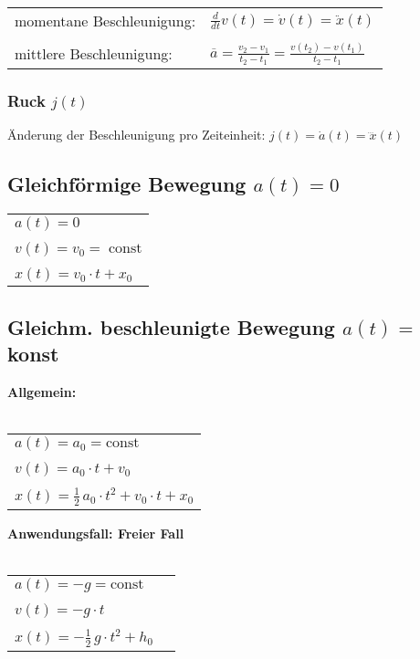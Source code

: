 	\begin{tabular}{ll}
	momentane Beschleunigung: & $\frac{d}{dt} v(t) = \dot{v}(t) = \ddot{x}(t)$ \\	
	\\
	mittlere Beschleunigung: & $\overline{a} = \frac{v_2 -v_1}{t_2 - t_1} =  \frac{v(t_2) - v(t_1)}{t_2 - t_1} $ \\
	\end{tabular}
	
		
		
		
	\subsubsection{Ruck $j(t)$}
	Änderung der Beschleunigung pro Zeiteinheit: $j(t) = \dot{a}(t) = \dddot{x}(t)$
	
		
		
	\subsection{Gleichförmige Bewegung $a(t) = 0$}
	\begin{tabular}{l}
	$a(t) = 0$ \\
	\\
	$v(t) = v_0 = \; \text{const}$ \\
	\\
	$x(t) = v_0 \cdot t + x_0 $ \\
	\end{tabular}
		

		
		
		
		
		
		
	\subsection{Gleichm. beschleunigte Bewegung $a(t) = $ konst}
	\begin{minipage}{0.48\linewidth}
	\textbf{Allgemein:} \\
	\\
	\begin{tabular}{l}
	$a(t) = a_0 = \text{const}$ \\
	\\
	$v(t) = a_0 \cdot t + v_0$ \\
	\\
	$x(t) = \frac{1}{2} \, a_0 \cdot t^2 + v_0 \cdot t + x_0$
	\end{tabular}
	\end{minipage}
	\hfill
	\begin{minipage}{0.48\linewidth}
	\textbf{Anwendungsfall: Freier Fall} \\
	\\
	\begin{tabular}{ll}
	$a(t) = -g = \text{const}$ \\
	\\
	$v(t) = -g \cdot t $ \\
	\\
	$x(t) = - \frac{1}{2} \, g \cdot t^2 + h_0$
	\end{tabular}
	\end{minipage}
	
